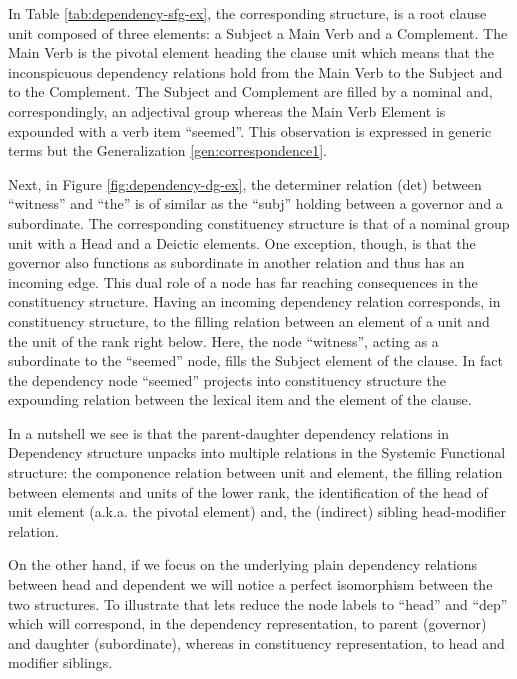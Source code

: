 In Table \ref{tab:dependency-sfg-ex}, the corresponding structure, is a root clause unit composed of three elements: a Subject a Main Verb and a Complement. The Main Verb is the pivotal element heading the clause unit which means that the inconspicuous dependency relations hold from the Main Verb to the Subject and to the Complement. The Subject and Complement are filled by a nominal and, correspondingly, an adjectival group whereas the Main Verb Element is expounded with a verb item ``seemed''.
This observation is expressed in generic terms but the Generalization \ref{gen:correspondence1}. 

Next, in Figure \ref{fig:dependency-dg-ex}, the determiner relation (det) between ``witness'' and ``the'' is of similar as the ``subj'' holding between a governor and a subordinate. The corresponding constituency structure is that of a nominal group unit with a Head and a Deictic elements. One exception, though, is that the governor also functions as subordinate in another relation and thus has an incoming edge. This dual role of a node has far reaching consequences in the constituency structure. Having an incoming dependency relation corresponds, in constituency structure, to the filling relation between an element of a unit and the unit of the rank right below. Here, the node ``witness'', acting as a subordinate to the ``seemed'' node, fills the Subject element of the clause. In fact the dependency node ``seemed'' projects into constituency structure the expounding relation between the lexical item and the element of the clause.

In a nutshell we see is that the parent-daughter dependency relations in Dependency structure unpacks into multiple relations in the Systemic Functional structure: the componence relation between unit and element, the filling relation between elements and units of the lower rank, the identification of the head of unit element (a.k.a. the pivotal element) and, the (indirect) sibling head-modifier relation.

On the other hand, if we focus on the underlying plain dependency relations between head and dependent we will notice a perfect isomorphism between the two structures. To illustrate that lets reduce the node labels to ``head'' and ``dep'' which will correspond, in the dependency representation, to parent (governor) and daughter (subordinate), whereas in constituency representation, to head and modifier siblings. 

